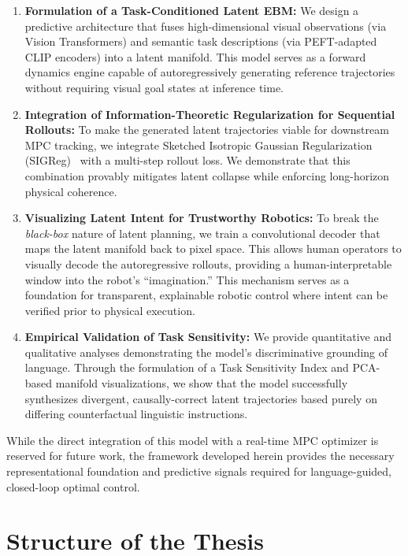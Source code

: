 \begin{enumerate}
	\item \textbf{Formulation of a Task-Conditioned Latent EBM:} We design a predictive architecture that fuses high-dimensional visual observations (via Vision Transformers) and semantic task descriptions (via PEFT-adapted CLIP encoders) into a latent manifold. This model serves as a forward dynamics engine capable of autoregressively generating reference trajectories without requiring visual goal states at inference time.

	\item \textbf{Integration of Information-Theoretic Regularization for Sequential Rollouts:} To make the generated latent trajectories viable for downstream MPC tracking, we integrate Sketched Isotropic Gaussian Regularization (SIGReg)~\cite{lejepa} with a multi-step rollout loss. We demonstrate that this combination provably mitigates latent collapse while enforcing long-horizon physical coherence.

	\item \textbf{Visualizing Latent Intent for Trustworthy Robotics:} To break the \textit{black-box} nature of latent planning, we train a convolutional decoder that maps the latent manifold back to pixel space. This allows human operators to visually decode the autoregressive rollouts, providing a human-interpretable window into the robot's ``imagination.'' This mechanism serves as a foundation for transparent, explainable robotic control where intent can be verified prior to physical execution.

	\item \textbf{Empirical Validation of Task Sensitivity:} We provide quantitative and qualitative analyses demonstrating the model's discriminative grounding of language. Through the formulation of a Task Sensitivity Index and PCA-based manifold visualizations, we show that the model successfully synthesizes divergent, causally-correct latent trajectories based purely on differing counterfactual linguistic instructions.
\end{enumerate}

While the direct integration of this model with a real-time MPC optimizer is reserved for future work, the framework developed herein provides the necessary representational foundation and predictive signals required for language-guided, closed-loop optimal control.

\section*{Structure of the Thesis}


